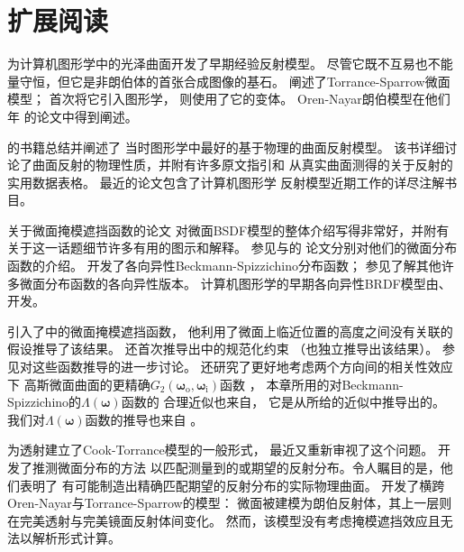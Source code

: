 \section{扩展阅读}\label{sec:扩展阅读08}
\citet{10.1145/360825.360839}为计算机图形学中的光泽曲面开发了早期经验反射模型。
尽管它既不互易也不能量守恒，但它是非朗伯体的首张合成图像的基石。
\citet{Torrance:67}阐述了Torrance-Sparrow微面模型；
\citet{10.1145/965141.563893}首次将它引入图形学，
\citet{10.1145/800224.806819,10.1145/357290.357293}则使用了它的变体。
Oren-Nayar朗伯模型在他们\citeyear{10.1145/192161.192213}年
的论文\citep{10.1145/192161.192213}中得到阐述。

\citet{10.1007/978-1-4612-3526-2}的书籍总结并阐述了
当时图形学中最好的基于物理的曲面反射模型。
该书详细讨论了曲面反射的物理性质，并附有许多原文指引和
从真实曲面测得的关于反射的实用数据表格。
\citet{Burley:2012:PBS}最近的论文包含了计算机图形学
反射模型近期工作的详尽注解书目。

\citet{heitz:hal-01024289}关于微面掩模遮挡函数的论文
对微面BSDF模型的整体介绍写得非常好，并附有关于这一话题细节许多有用的图示和解释。
参见\citet{1987BeckmannSpizzichino}与\citet{Trowbridge:75}的
论文分别对他们的微面分布函数的介绍。
\citet{10.1145/1722991.1722996}开发了各向异性Beckmann-Spizzichino分布函数；
参见\citet{heitz:hal-01024289}了解其他许多微面分布函数的各向异性版本。
计算机图形学的早期各向异性BRDF模型由\citet{10.1145/325334.325167}、
\citet{10.1145/97879.97909}开发。

\citet{1138991}引入了中的微面掩模遮挡函数，
他利用了微面上临近位置的高度之间没有关联的假设推导了该结果。
\citeauthor{1138991}还首次推导出中的规范化约束
（\citet{10.1145/344779.344814}也独立推导出该结果）。
参见\citet{heitz:hal-01024289}对这些函数推导的进一步讨论。
\citet{Heitz01082013}还研究了更好地考虑两个方向间的相关性效应下
高斯微面曲面的更精确$G_2({\bm\omega}_{\mathrm{o}},{\bm\omega}_{\mathrm{i}})$函数
，
本章所用的对Beckmann-Spizzichino的$\Lambda({\bm\omega})$函数的
合理近似也来自\citet{heitz:hal-01024289}，
它是从\citet{10.5555/2383847.2383874}所给的近似中推导出的。
我们对$\Lambda({\bm\omega})$函数的推导也来自\citet{heitz:hal-01024289}
。

\citet{10.1007/978-3-7091-6242-2_4}为透射建立了Cook-Torrance模型的一般形式，
最近\citet{10.5555/2383847.2383874}又重新审视了这个问题。
\citet{10.1145/1531326.1531338}开发了推测微面分布的方法
以匹配测量到的或期望的反射分布。令人瞩目的是，他们表明了
有可能制造出精确匹配期望的反射分布的实际物理曲面。
\citet{Simonot:09}开发了横跨Oren-Nayar与Torrance-Sparrow的模型：
微面被建模为朗伯反射体，其上一层则在完美透射与完美镜面反射体间变化。
然而，该模型没有考虑掩模遮挡效应且无法以解析形式计算。

